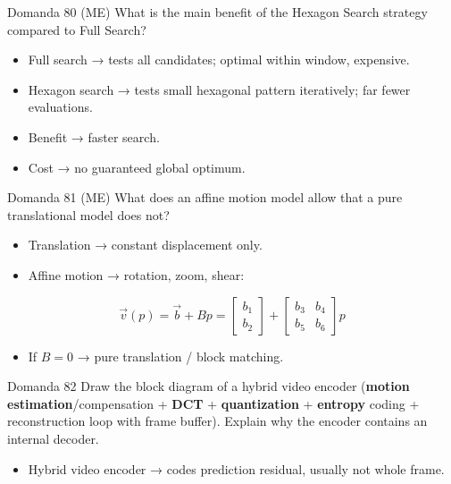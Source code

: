\begin{questionbox}{Domanda 80}
(ME) What is the main benefit of the Hexagon Search strategy compared to Full Search?
\end{questionbox}


\begin{itemize}
  \item Full search → tests all candidates; optimal within window, expensive.
  \item Hexagon search → tests small hexagonal pattern iteratively; far fewer evaluations.
  \item Benefit → faster search.
  \item Cost → no guaranteed global optimum.
\end{itemize}



\begin{questionbox}{Domanda 81}
(ME) What does an affine motion model allow that a pure translational model does not?
\end{questionbox}


\begin{itemize}
  \item Translation → constant displacement only.
  \item Affine motion → rotation, zoom, shear:
\end{itemize}


$$
\vec{v}(p)=\vec{b}+Bp
=
\begin{bmatrix}b_1\\b_2\end{bmatrix}
+
\begin{bmatrix}b_3&b_4\\b_5&b_6\end{bmatrix}p
$$


\begin{itemize}
  \item If $B=0$ → pure translation / block matching.
\end{itemize}



\begin{questionbox}{Domanda 82}
Draw the block diagram of a hybrid video encoder (\textbf{motion estimation}/compensation + \textbf{DCT} + \textbf{quantization} + \textbf{entropy} coding + reconstruction loop with frame buffer). Explain why the encoder contains an internal decoder.
\end{questionbox}


\begin{itemize}
  \item Hybrid video encoder → codes prediction residual, usually not whole frame.
\end{itemize}

